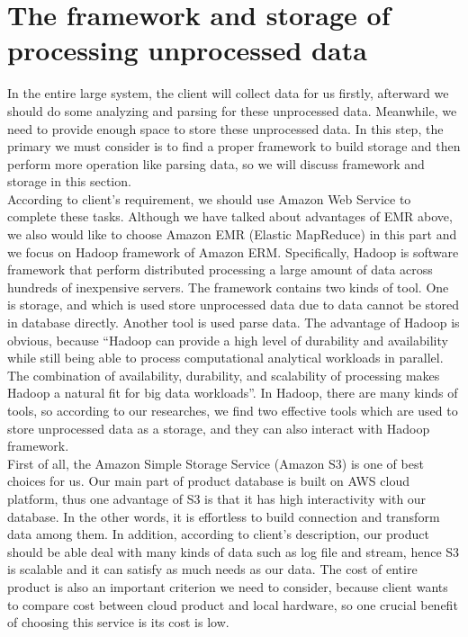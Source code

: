 \section{The framework and storage of processing unprocessed data}
        In the entire large system, the client will collect data for us firstly, afterward we should do some analyzing and parsing for these unprocessed data. Meanwhile, we need to provide enough space to store these unprocessed data. In this step, the primary we must consider is to find a proper framework to build storage and then perform more operation like parsing data, so we will discuss framework and storage in this section.\\

        \noindent According to client’s requirement, we should use Amazon Web Service to complete these tasks. Although we have talked about advantages of EMR above, we also would like to choose Amazon EMR (Elastic MapReduce) in this part and we focus on Hadoop framework of Amazon ERM. Specifically, Hadoop is software framework that perform distributed processing a large amount of data across hundreds of inexpensive servers\cite{Z1}. The framework contains two kinds of tool. One is storage, and which is used store unprocessed data due to data cannot be stored in database directly. Another tool is used parse data. The advantage of Hadoop is obvious, because “Hadoop can provide a high level of durability and availability while still being able to process computational analytical workloads in parallel. The combination of availability, durability, and scalability of processing makes Hadoop a natural fit for big data workloads”\cite{Z2}. In Hadoop, there are many kinds of tools, so according to our researches, we find two effective tools which are used to store unprocessed data as a storage, and they can also interact with Hadoop framework.\\ 

        \noindent First of all, the Amazon Simple Storage Service (Amazon S3) is one of best choices for us. Our main part of product database is built on AWS cloud platform, thus one advantage of S3 is that it has high interactivity with our database. In the other words, it is effortless to build connection and transform data among them. In addition, according to client’s description, our product should be able deal with many kinds of data such as log file and stream, hence S3 is scalable and it can satisfy as much needs as our data. The cost of entire product is also an important criterion we need to consider, because client wants to compare cost between cloud product and local hardware, so one crucial benefit of choosing this service is its cost is low.\\

